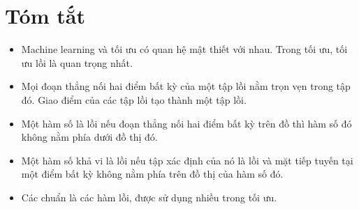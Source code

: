  
\section{Tóm tắt}
\begin{itemize}
    \item Machine learning và tối ưu có quan hệ mật thiết với nhau. Trong
    tối ưu, tối ưu lồi là quan trọng nhất. 
     
    \item Mọi đoạn thẳng nối hai điểm bất kỳ của một tập lồi nằm trọn vẹn trong tập đó. Giao điểm của các tập lồi tạo thành một
    tập lồi. 

    \item Một hàm số là lồi nếu đoạn thẳng nối hai điểm bất kỳ trên đồ thì hàm
    số đó {không nằm phía dưới} đồ thị đó.
     
    \item Một hàm số khả vi là lồi nếu tập xác định của nó là lồi 
    và mặt tiếp tuyến tại một điểm bất kỳ {không nằm phía trên} đồ thị
    của hàm số đó.
     
    \item Các chuẩn là các hàm lồi, được sử dụng nhiều trong tối ưu. 
 
\end{itemize}
 
 
 
 

